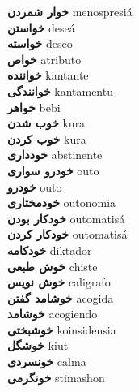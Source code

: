 \textbf{ خوار شمردن  } menospresiá \\
\textbf{ خواستن  } deseá \\
\textbf{ خواسته  } deseo \\
\textbf{ خواص  } atributo \\
\textbf{ خواننده  } kantante \\
\textbf{ خوانندگی  } kantamentu \\
\textbf{ خواهر  } bebi \\
\textbf{ خوب شدن  } kura \\
\textbf{ خوب کردن  } kura \\
\textbf{ خودداری  } abstinente \\
\textbf{ خودرو سواری  } outo \\
\textbf{ خودرو  } outo \\
\textbf{ خودمختاری  } outonomia \\
\textbf{ خودکار بودن  } outomatisá \\
\textbf{ خودکار کردن  } outomatisá \\
\textbf{ خودکامه  } diktador \\
\textbf{ خوش طبعی  } chiste \\
\textbf{ خوش نویس  } caligrafo \\
\textbf{ خوشامد گفتن  } acogida \\
\textbf{ خوشامد  } acogiendo \\
\textbf{ خوشبختی  } koinsidensia \\
\textbf{ خوشگل  } kiut \\
\textbf{ خونسردی  } calma \\
\textbf{ خونگرمی  } stimashon \\
